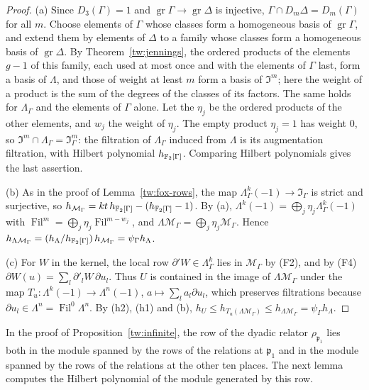 \begin{proof}
(a) Since $D_3(\Gamma)=1$ and $\operatorname{gr}\Gamma\to\operatorname{gr}\Delta$
is injective, $\Gamma\cap D_m\Delta=D_m(\Gamma)$ for all $m$. Choose elements
of $\Gamma$ whose classes form a homogeneous basis of $\operatorname{gr}\Gamma$,
and extend them by elements of $\Delta$ to a family whose classes form a
homogeneous basis of $\operatorname{gr}\Delta$. By Theorem~\ref{tw:jennings},
the ordered products of the elements $g-1$ of this family, each used at most
once and with the elements of $\Gamma$ last, form a basis of $\Lambda$, and
those of weight at least $m$ form a basis of $\mathfrak I^m$; here the weight
of a product is the sum of the degrees of the classes of its factors. The
same holds for $\Lambda_\Gamma$ and the elements of $\Gamma$ alone. Let the
$\eta_j$ be the ordered products of the other elements, and $w_j$ the weight
of $\eta_j$. The empty product $\eta_j=1$ has weight $0$, so
$\mathfrak I^m\cap\Lambda_\Gamma=\mathfrak I_\Gamma^m$: the filtration of
$\Lambda_\Gamma$ induced from $\Lambda$ is its augmentation filtration, with
Hilbert polynomial $h_{\mathbb F_2[\Gamma]}$. Comparing Hilbert polynomials gives the
last assertion.

(b) As in the proof of Lemma~\ref{tw:fox-rows}, the map
$\Lambda_\Gamma^k(-1)\to\mathfrak I_\Gamma$ is strict and surjective, so
$h_{\mathcal M_\Gamma}=kt\,h_{\mathbb F_2[\Gamma]}-(h_{\mathbb F_2[\Gamma]}-1)$. By (a),
$\Lambda^k(-1)=\bigoplus_j\eta_j\Lambda_\Gamma^k(-1)$ with
$\operatorname{Fil}^m=\bigoplus_j\eta_j\operatorname{Fil}^{m-w_j}$, and
$\Lambda\mathcal M_\Gamma=\bigoplus_j\eta_j\mathcal M_\Gamma$. Hence
$h_{\Lambda\mathcal M_\Gamma}=(h_\Lambda/h_{\mathbb F_2[\Gamma]})\,h_{\mathcal M_\Gamma}=\psi_\Gamma h_\Lambda$.

(c) For $W$ in the kernel, the local row $\partial'W\in\Lambda_\Gamma^k$ lies in
$\mathcal M_\Gamma$ by (F2), and by (F4)
$\partial W(u)=\sum_l\partial'_lW\,\partial u_l$. Thus $U$ is contained in the
image of $\Lambda\mathcal M_\Gamma$ under the map
$T_u\colon\Lambda^k(-1)\to\Lambda^n(-1)$, $a\mapsto\sum_la_l\partial u_l$,
which preserves filtrations because
$\partial u_l\in\Lambda^n=\operatorname{Fil}^0\Lambda^n$. By (h2),
(h1) and (b),
$h_U\le h_{T_u(\Lambda\mathcal M_\Gamma)}\le h_{\Lambda\mathcal M_\Gamma}=\psi_\Gamma h_\Lambda$.
\end{proof}

In the proof of Proposition~\ref{tw:infinite}, the row of the dyadic relator
$\rho_{\mathfrak p_1}$ lies both in the module spanned by the rows of the
relations at $\mathfrak p_1$ and in the module spanned by the rows of the
relations at the other ten places. The next lemma computes the Hilbert
polynomial of the module generated by this row.

